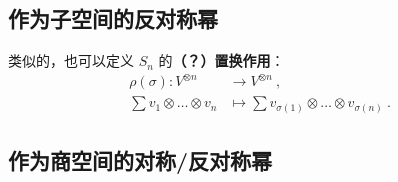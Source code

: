 \subsection{作为子空间的反对称幂}

类似的，也可以定义 $S_n$ 的\textbf{（？）置换作用}：
\begin{equation}
\begin{aligned}
\rho(\sigma): V^{\otimes n} &\to V^{\otimes n}~, \\
\sum v_1 \otimes \dots \otimes v_n &\mapsto \sum v_{\sigma(1)} \otimes \dots \otimes v_{\sigma(n)}~.
\end{aligned}
\end{equation}

\subsection{作为商空间的对称/反对称幂}